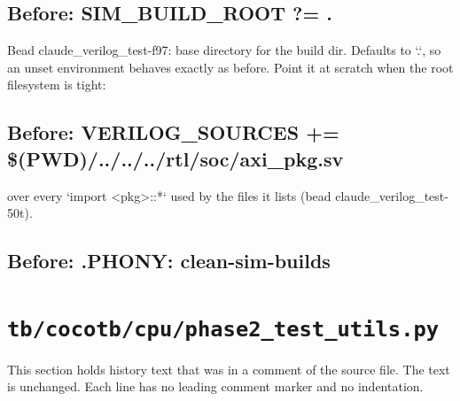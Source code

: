 \begin{record}

\subsection*{Before: SIM\_BUILD\_ROOT ?= .}

\begin{textblock}
Bead claude_verilog_test-f97: base directory for the build dir.  Defaults to
`.`, so an unset environment behaves exactly as before.  Point it at scratch
when the root filesystem is tight:
\end{textblock}

\subsection*{Before: VERILOG\_SOURCES += \$(PWD)/../../../rtl/soc/axi\_pkg.sv}

\begin{textblock}
over every `import <pkg>::*` used by the files it lists (bead claude_verilog_test-50t).
\end{textblock}

\subsection*{Before: .PHONY: clean-sim-builds}


\end{record}

\section{\texttt{tb/cocotb/cpu/phase2\_test\_utils.py}}\label{cr:suite:cpu-phase2-test-utils}

This section holds history text that was in a comment of the source file. The text is unchanged. Each line has no leading comment marker and no indentation.

